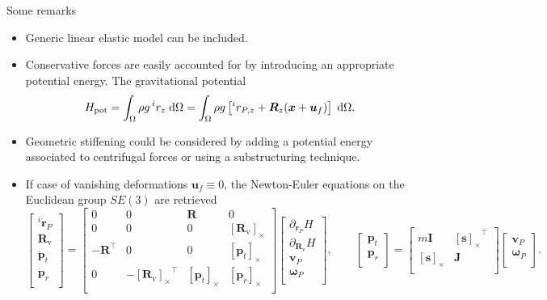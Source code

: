 \documentclass[aspectratio=169]{ISAE-Beamer}
\newcommand{\crmat}[1]{\ensuremath{[#1]_{\times}}}
\begin{document}
\begin{frame}{Some remarks}

\begin{itemize}
	\item Generic linear elastic model can be included.
	\item Conservative forces are easily accounted for by introducing an appropriate potential energy. The gravitational potential
	\begin{equation*}
	H_{\text{pot}} = \int_{\Omega} \rho g \, ^i r_z \d{\Omega} = \int_{\Omega} \rho g \left[ ^i r_{P, z} +\bm{R}_z (\bm{x} + \bm{u}_f) \right] \d{\Omega}.
	\end{equation*}
	\item Geometric stiffening could be considered by adding a potential energy associated to centrifugal forces or using a substructuring technique.
	\item If case of vanishing deformations $\bm{u}_f \equiv 0$, the Newton-Euler equations on the Euclidean group $SE(3)$ are retrieved
	\begin{equation*}
	\begin{bmatrix}
	^i\dot{\bm{r}}_P \\ \bm{R}_{\text{v}} \\\dot{\bm{p}}_t \\ \dot{\bm{p}}_r \\
	\end{bmatrix} = 
	\begin{bmatrix}
	0 & 0 & \bm{R} & 0 \\
	0 & 0 & 0 & \crmat{\bm{R}_{\text{v}}} \\
	- \bm{R}^\top & 0 & 0 & \crmat{\bm{p}_t}\\
	0 & -\crmat{\bm{R}_{\text{v}}}^\top & \crmat{\bm{p}_t} & \crmat{\bm{p}_r} \\
	\end{bmatrix}
	\begin{bmatrix}
	\partial_{\bm{r}_P} H \\ \partial_{\bm{R}_{\text{v}}} H \\ \bm{v}_P \\ \bm{\omega}_P  \\
	\end{bmatrix}, \qquad
	\begin{bmatrix}
	\bm{p}_t \\ \bm{p}_r \\ 
	\end{bmatrix} = 
	\begin{bmatrix}
	m \bm{I} & \crmat{\bm{s}}^\top \\
	\crmat{\bm{s}} & \bm{J} \\
	\end{bmatrix}
	\begin{bmatrix}
	\bm{v}_P \\ \bm{\omega}_P  \\ 
	\end{bmatrix}.
	\end{equation*}
\end{itemize}
\end{frame}
\end{document}
